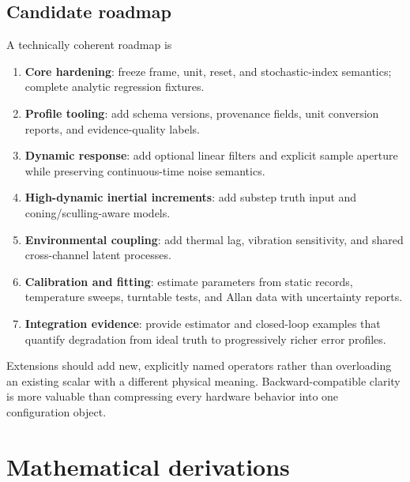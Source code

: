\documentclass[11pt,oneside,headings=big]{scrreprt}
\begin{document}
    \section{Candidate roadmap}
    A technically coherent roadmap is
    \begin{enumerate}
        \item \textbf{Core hardening}: freeze frame, unit, reset, and stochastic-index
        semantics; complete analytic regression fixtures.
        \item \textbf{Profile tooling}: add schema versions, provenance fields, unit
        conversion reports, and evidence-quality labels.
        \item \textbf{Dynamic response}: add optional linear filters and explicit
        sample aperture while preserving continuous-time noise semantics.
        \item \textbf{High-dynamic inertial increments}: add substep truth input and
        coning/sculling-aware models.
        \item \textbf{Environmental coupling}: add thermal lag, vibration sensitivity,
        and shared cross-channel latent processes.
        \item \textbf{Calibration and fitting}: estimate parameters from static records,
        temperature sweeps, turntable tests, and Allan data with uncertainty reports.
        \item \textbf{Integration evidence}: provide estimator and closed-loop examples
        that quantify degradation from ideal truth to progressively richer error
        profiles.
    \end{enumerate}

    \begin{engineeringbox}
        Extensions should add new, explicitly named operators rather than overloading an
        existing scalar with a different physical meaning. Backward-compatible clarity is
        more valuable than compressing every hardware behavior into one configuration
        object.
    \end{engineeringbox}


    \appendix


    \chapter{Mathematical derivations}
    \label{app:derivations}
\end{document}
